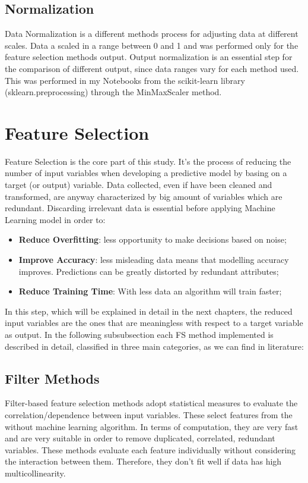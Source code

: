 \subsection{Normalization}
Data Normalization is a different methods process for adjusting data at different scales. Data a scaled in a range between 0 and 1 and was performed only for the feature selection methods output.
Output normalization is an essential step for the comparison of different output, since data ranges vary for each method used.\newline
This was performed in my Notebooks from the scikit-learn library (sklearn.preprocessing) through the MinMaxScaler method.
\section{Feature Selection}
Feature Selection is the core part of this study. It's the process of reducing the number of input variables when developing a predictive model by basing on a target (or output) variable. 
Data collected, even if have been cleaned and transformed, are anyway characterized by big amount of variables which are redundant.
Discarding irrelevant data is essential before applying Machine Learning model in order to:
\begin{itemize}
\item \textbf{Reduce Overfitting}: less opportunity to make decisions based on noise;
\item \textbf{Improve Accuracy}: less misleading data means that modelling accuracy improves. Predictions can be greatly distorted by redundant attributes;
\item \textbf{Reduce Training Time}: With less data an algorithm will train faster;
\end{itemize}
In this step, which will be explained in detail in the next chapters, the reduced input variables are the ones that are meaningless with respect to a target variable as output. \newline
In the following subsubsection each FS method implemented is described in detail, classified in three main categories\cite{stanczyk2015feature}, as we can find in literature:
\subsection{Filter Methods}
Filter-based feature selection methods adopt statistical measures to evaluate the correlation/dependence between input variables.\newline
These select features from the without machine learning algorithm. In terms of computation, they are very fast and are very suitable in order to remove duplicated, correlated, redundant variables\cite{saeys2007review}. \newline
These methods evaluate each feature individually without considering the interaction between them. Therefore, they don't fit well if data has high multicollinearity\cite{daoud2017multicollinearity}.

